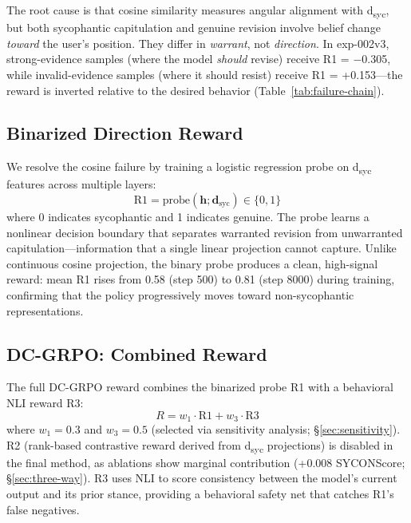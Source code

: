 \documentclass[11pt,a4paper]{article}
\begin{document}
The root cause is that cosine similarity measures angular alignment with d\textsubscript{syc}, but both sycophantic capitulation and genuine revision involve belief change \emph{toward} the user's position.
They differ in \emph{warrant}, not \emph{direction}.
In exp-002v3, strong-evidence samples (where the model \emph{should} revise) receive R1 = $-$0.305, while invalid-evidence samples (where it should resist) receive R1 = +0.153---the reward is inverted relative to the desired behavior (Table~\ref{tab:failure-chain}).

\subsection{Binarized Direction Reward}
\label{sec:probe}

We resolve the cosine failure by training a logistic regression probe on d\textsubscript{syc} features across multiple layers:
\begin{equation}
    \text{R1} = \text{probe}(\mathbf{h}; \mathbf{d}_{\text{syc}}) \in \{0, 1\}
\end{equation}
where 0 indicates sycophantic and 1 indicates genuine.
The probe learns a nonlinear decision boundary that separates warranted revision from unwarranted capitulation---information that a single linear projection cannot capture.
Unlike continuous cosine projection, the binary probe produces a clean, high-signal reward: mean R1 rises from 0.58 (step 500) to 0.81 (step 8000) during training, confirming that the policy progressively moves toward non-sycophantic representations.

\subsection{DC-GRPO: Combined Reward}
\label{sec:dc-grpo}

The full DC-GRPO reward combines the binarized probe R1 with a behavioral NLI reward R3:
\begin{equation}
    R = w_1 \cdot \text{R1} + w_3 \cdot \text{R3}
\end{equation}
where $w_1 = 0.3$ and $w_3 = 0.5$ (selected via sensitivity analysis; \S\ref{sec:sensitivity}).
R2 (rank-based contrastive reward derived from d\textsubscript{syc} projections) is disabled in the final method, as ablations show marginal contribution (+0.008 SYCONScore; \S\ref{sec:three-way}).
R3 uses NLI to score consistency between the model's current output and its prior stance, providing a behavioral safety net that catches R1's false negatives.
\end{document}
